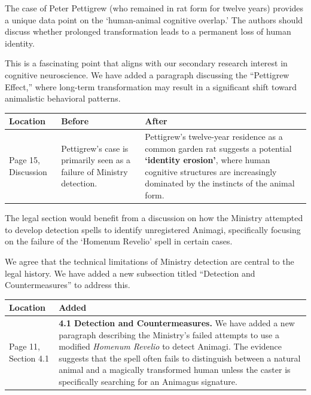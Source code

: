 \documentclass[
  letterpaper,
  DIV=11,
  numbers=noendperiod]{scrartcl}
\begin{document}
\begin{reviewerbox}

The case of Peter Pettigrew (who remained in rat form for twelve years) provides a unique data point on the `human-animal cognitive overlap.' The authors should discuss whether prolonged transformation leads to a permanent loss of human identity.

\end{reviewerbox}

This is a fascinating point that aligns with our secondary research interest in cognitive neuroscience. We have added a paragraph discussing the ``Pettigrew Effect,'' where long-term transformation may result in a significant shift toward animalistic behavioral patterns.

\begin{longtable*}{p{0.18\textwidth} p{0.36\textwidth} p{0.36\textwidth}}
\toprule
\textbf{Location} & \textbf{Before} & \textbf{After} \\
\midrule
\endhead
Page 15, Discussion & Pettigrew's case is primarily seen as a failure of Ministry detection. & Pettigrew's twelve-year residence as a common garden rat suggests a
potential \textbf{`identity erosion'}, where human cognitive structures
are increasingly dominated by the instincts of the animal form. \\
\midrule
\end{longtable*}

\begin{reviewerbox}

The legal section would benefit from a discussion on how the Ministry attempted to develop detection spells to identify unregistered Animagi, specifically focusing on the failure of the `Homenum Revelio' spell in certain cases.

\end{reviewerbox}

We agree that the technical limitations of Ministry detection are central to the legal history. We have added a new subsection titled ``Detection and Countermeasures'' to address this.

\begin{longtable*}{p{0.2\textwidth} p{0.7\textwidth}}
\toprule
\textbf{Location} & \textbf{Added} \\
\midrule
\endhead
Page 11, Section 4.1 & \textbf{4.1 Detection and Countermeasures.} We have added a new
paragraph describing the Ministry's failed attempts to use a modified
\emph{Homenum Revelio} to detect Animagi. The evidence suggests that the
spell often fails to distinguish between a natural animal and a
magically transformed human unless the caster is specifically searching
for an Animagus signature. \\
\midrule
\end{longtable*}
\end{document}
